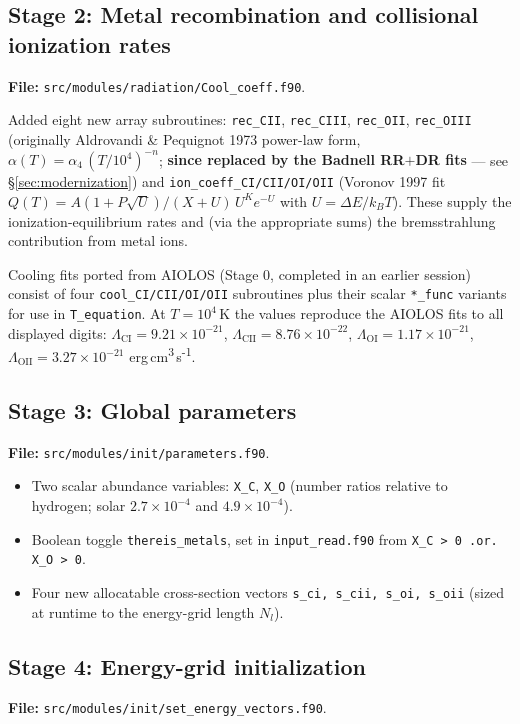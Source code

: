 \documentclass[english,a4paper]{kiseon_memo}
\begin{document}
\subsection{Stage 2: Metal recombination and collisional ionization rates}
\textbf{File:} \texttt{src/modules/radiation/Cool\_coeff.f90}.

Added eight new array subroutines:
\texttt{rec\_CII}, \texttt{rec\_CIII}, \texttt{rec\_OII},
\texttt{rec\_OIII} (originally Aldrovandi \& Pequignot 1973 power-law
form, \(\alpha(T) = \alpha_4\,(T/10^{4})^{-n}\); \textbf{since replaced
by the Badnell RR$+$DR fits} --- see
\S\ref{sec:modernization}) and
\texttt{ion\_coeff\_CI/CII/OI/OII} (Voronov 1997 fit
\(Q(T) = A(1+P\sqrt{U})/(X+U)\,U^{K}e^{-U}\) with
\(U = \Delta E/k_BT\)).  These supply the
ionization-equilibrium rates and (via the appropriate sums) the
bremsstrahlung contribution from metal ions.

Cooling fits ported from AIOLOS (Stage 0, completed in an earlier
session) consist of four \texttt{cool\_CI/CII/OI/OII} subroutines plus
their scalar \texttt{*\_func} variants for use in \texttt{T\_equation}.
At \(T = 10^{4}\)\,K the values reproduce the AIOLOS fits to all
displayed digits:
\(\Lambda_{\mathrm{CI}} = 9.21\times10^{-21}\),
\(\Lambda_{\mathrm{CII}} = 8.76\times10^{-22}\),
\(\Lambda_{\mathrm{OI}} = 1.17\times10^{-21}\),
\(\Lambda_{\mathrm{OII}} = 3.27\times10^{-21}\) erg\,cm\textsuperscript{3}\,s\textsuperscript{-1}.

\subsection{Stage 3: Global parameters}
\textbf{File:} \texttt{src/modules/init/parameters.f90}.

\begin{itemize}
  \item Two scalar abundance variables: \texttt{X\_C}, \texttt{X\_O}
    (number ratios relative to hydrogen; solar
    \(2.7\times10^{-4}\) and \(4.9\times10^{-4}\)).
  \item Boolean toggle \texttt{thereis\_metals}, set in
    \texttt{input\_read.f90} from
    \texttt{X\_C > 0 .or. X\_O > 0}.
  \item Four new allocatable cross-section vectors
    \texttt{s\_ci, s\_cii, s\_oi, s\_oii} (sized at runtime to the
    energy-grid length \(N_l\)).
\end{itemize}

\subsection{Stage 4: Energy-grid initialization}
\textbf{File:} \texttt{src/modules/init/set\_energy\_vectors.f90}.
\end{document}
